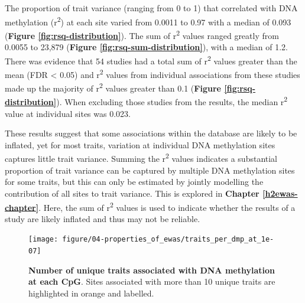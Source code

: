\documentclass[11pt,twoside]{bristolthesis}
\begin{document}
The proportion of trait variance (ranging from 0 to 1) that correlated with DNA methylation (r\textsuperscript{2}) at each site varied from 0.0011 to 0.97 with a median of 0.093 (\textbf{Figure \ref{fig:rsq-distribution}}). The sum of r\textsuperscript{2} values ranged greatly from 0.0055 to 23,879 (\textbf{Figure \ref{fig:rsq-sum-distribution}}), with a median of 1.2. There was evidence that 54 studies had a total sum of r\textsuperscript{2} values greater than the mean (FDR \textless{} 0.05) and r\textsuperscript{2} values from individual associations from these studies made up the majority of r\textsuperscript{2} values greater than 0.1 (\textbf{Figure \ref{fig:rsq-distribution}}). When excluding those studies from the results, the median r\textsuperscript{2} value at individual sites was 0.023.



These results suggest that some associations within the database are likely to be inflated, yet for most traits, variation at individual DNA methylation sites captures little trait variance. Summing the r\textsuperscript{2} values indicates a substantial proportion of trait variance can be captured by multiple DNA methylation sites for some traits, but this can only be estimated by jointly modelling the contribution of all sites to trait variance. This is explored in \textbf{Chapter \ref{h2ewas-chapter}}. Here, the sum of r\textsuperscript{2} values is used to indicate whether the results of a study are likely inflated and thus may not be reliable.

\pagebreak




\begin{figure}[!hp]

{\centering \texttt{[image: figure/04-properties\_of\_ewas/traits\_per\_dmp\_at\_1e-07]} 

}

\caption[Number of unique traits associated with DNA methylation at each CpG]{\textbf{Number of unique traits associated with DNA methylation at each CpG}. Sites associated with more than 10 unique traits are highlighted in orange and labelled.}\label{fig:traits-manhattan}
\end{figure}
\end{document}
